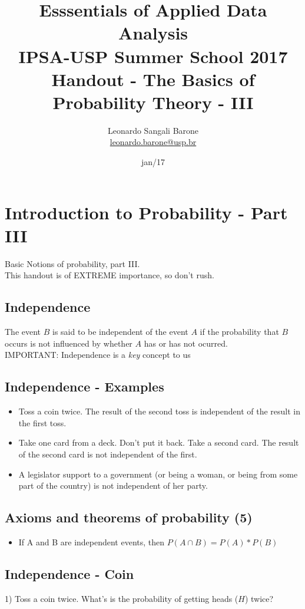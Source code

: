 \documentclass[11pt]{article}
\title{\textbf{Esssentials of Applied Data Analysis\\
				IPSA-USP Summer School 2017}\newline\\
				Handout - The Basics of Probability Theory - III}
\author{Leonardo Sangali Barone\\ \href{leonardo.barone@usp.br}{leonardo.barone@usp.br}}
\date{jan/17}
\begin{document}
\maketitle

\section*{Introduction to Probability - Part III}

	Basic Notions of probability, part III.\\

	This handout is of EXTREME importance, so don't rush.

	\subsection*{Independence}
	The event $B$ is said to be independent of the event $A$ if the probability that $B$ occurs is not influenced by whether $A$ has or has not ocurred.\\

	IMPORTANT: Independence is a \emph{key} concept to us	

	\subsection*{Independence - Examples}
	\begin{itemize}
		\item Toss a coin twice. The result of the second toss is independent of the result in the first toss. 
		\item Take one card from a deck. Don't put it back. Take a second card. The result of the second card is not independent of the first.
		\item A legislator support to a government (or being a woman, or being from some part of the country) is not independent of her party.		
	\end{itemize}	



	\subsection*{Axioms and theorems of probability (5)}
	\begin{itemize}
		\item If A and B are independent events, then $P(A \cap B) = P(A) * P(B)$
	\end{itemize}


	\subsection*{Independence - Coin}
	1) Toss a coin twice.
	What's is the probability of getting heads ($H$) twice?
\end{document}
